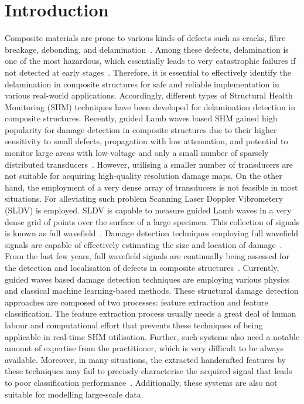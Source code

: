 \section{Introduction}
Composite materials are prone to various kinds of defects such as cracks, fibre breakage, debonding, and delamination~\cite{ip2004delamination, smith2009composite}. 
Among these defects, delamination is one of the most hazardous, which essentially leads to very catastrophic failures if not detected at early stages~\cite{valdes1999delamination}. 
Therefore, it is essential to effectively identify the delamination in composite structures for safe and reliable implementation in various real-world applications.  
Accordingly, different types of Structural Health Monitoring (SHM) techniques have been developed for delamination detection in composite structures. 
Recently, guided Lamb waves based SHM gained high popularity for damage detection in composite structures due to their higher sensitivity to small defects, propagation with low attenuation, and potential to monitor large areas with low-voltage and only a small number of sparsely distributed transducers~\cite{alleyne1992interaction, giurgiutiu2003lamb, Ihn2008, mitra2016guided}. 
However, utilising a smaller number of transducers are not suitable for acquiring high-quality resolution damage maps. 
On the other hand, the employment of a very dense array of transducers is not feasible in most situations. 
For alleviating such problem Scanning Laser Doppler Vibrometery (SLDV) is employed. 
SLDV is capable to measure guided Lamb waves in a very dense grid of points over the surface of a large specimen. 
This collection of signals is known as full wavefield~\cite{Radzienski2019a}. 
Damage detection techniques employing full wavefield signals are capable of effectively estimating the size and location of damage~\cite{Girolamo2018a, kudela2018impact}. 
From the last few years, full wavefield signals are continually being assessed for the detection and localisation of defects in composite structures~\cite{Radzienski2019a, kudela2018impact, sohn2011delamination, sohn2011automated, rogge2013characterization}.
Currently, guided waves based damage detection techniques are employing various physics and classical machine learning-based methods. 
These structural damage detection approaches are composed of two processes: feature extraction and feature classification. 
The feature extraction process usually needs a great deal of human labour and computational effort that prevents these techniques of being applicable in real-time SHM utilisation. 
Further, such systems also need a notable amount of expertise from the practitioner, which is very difficult to be always available.
Moreover, in many situations, the extracted handcrafted features by these techniques may fail to precisely characterise the acquired signal that leads to poor classification performance~\cite{Zhao2019b, Yuan2020}. 
Additionally, these systems are also not suitable for modelling large-scale data.

